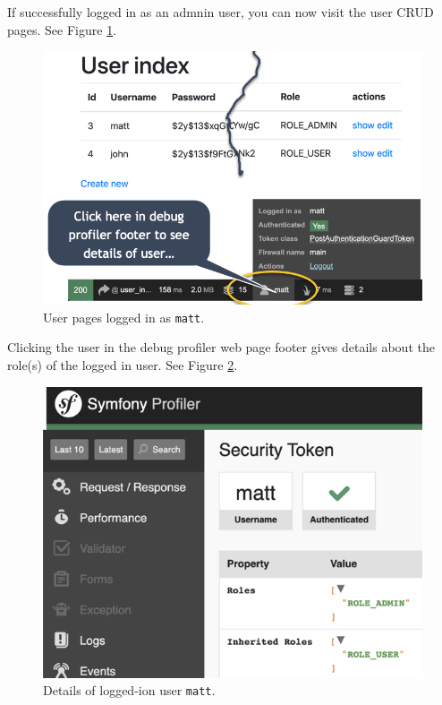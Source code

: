 \documentclass[a4paperpaper,openright]{book}
\begin{document}
If successfully logged in as an admnin user, you can now visit the user
CRUD pages. See Figure \ref{user_matt}.

\begin{figure}
\centering
\includegraphics[width=1\textwidth,height=\textheight]{./tex2pdf.-2b0e1314f8bbbae5/84cffeb13f942d54d447415ae700cc1724cc61f3.png}
\caption{User pages logged in as \texttt{matt}. \label{user_matt}}
\end{figure}

Clicking the user in the debug profiler web page footer gives details
about the role(s) of the logged in user. See Figure
\ref{user_matt_details}.

\begin{figure}
\centering
\includegraphics[width=1\textwidth,height=\textheight]{./tex2pdf.-2b0e1314f8bbbae5/2983cfab1ceb9b17b7d12ec02312c0bd2617b9da.png}
\caption{Details of logged-ion user \texttt{matt}.
\label{user_matt_details}}
\end{figure}
\end{document}
